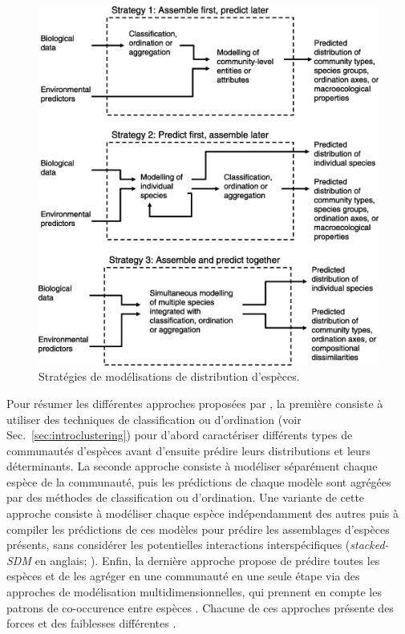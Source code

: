 \begin{refsection}
\begin{figure}
\hypertarget{fig:intro9}{%
\centering
\includegraphics{02-Introduction/figures/ferriers_strategies.png}
\caption[Stratégies de modélisations de distribution d'espèces.]{Stratégies de modélisations de distribution d'espèces.
\textcite{Ferrier_2006}}\label{fig:intro9}
}
\end{figure}

Pour résumer les différentes approches proposées par
\textcite{Ferrier_2006}, la première consiste à utiliser des techniques
de classification ou d'ordination (voir Sec.~\ref{sec:introclustering})
pour d'abord caractériser différents types de communautés d'espèces
avant d'ensuite prédire leurs distributions et leurs déterminants. La
seconde approche consiste à modéliser séparément chaque espèce de la
communauté, puis les prédictions de chaque modèle sont agrégées par des
méthodes de classification ou d'ordination. Une variante de cette
approche consiste à modéliser chaque espèce indépendamment des autres
puis à compiler les prédictions de ces modèles pour prédire les
assemblages d'espèces présents, sans considérer les potentielles
interactions interspécifiques (\emph{stacked-SDM} en anglais;
\textcite{Pollock_2020}). Enfin, la dernière approche propose de prédire
toutes les espèces et de les agréger en une communauté en une seule
étape via des approches de modélisation multidimensionnelles, qui
prennent en compte les patrons de co-occurence entre espèces
\autocite{Warton_2015}. Chacune de ces approches présente des forces et
des faiblesses différentes \autocites[ ]{DAmen_2017}[
]{Pollock_2020}{Norberg_2019}.


\end{refsection}
